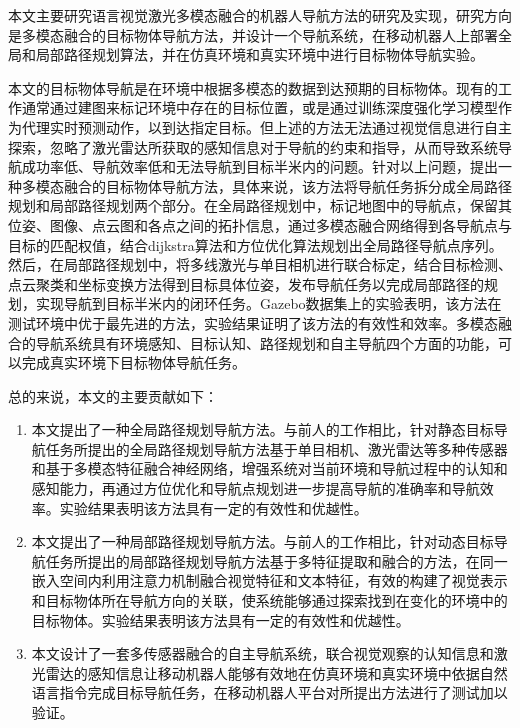 	本文主要研究语言视觉激光多模态融合的机器人导航方法的研究及实现，研究方向是多模态融合的目标物体导航方法，并设计一个导航系统，在移动机器人上部署全局和局部路径规划算法，并在仿真环境和真实环境中进行目标物体导航实验。
	
	本文的目标物体导航是在环境中根据多模态的数据到达预期的目标物体。现有的工作通常通过建图来标记环境中存在的目标位置，或是通过训练深度强化学习模型作为代理实时预测动作，以到达指定目标。但上述的方法无法通过视觉信息进行自主探索，忽略了激光雷达所获取的感知信息对于导航的约束和指导，从而导致系统导航成功率低、导航效率低和无法导航到目标半米内的问题。针对以上问题，提出一种多模态融合的目标物体导航方法，具体来说，该方法将导航任务拆分成全局路径规划和局部路径规划两个部分。在全局路径规划中，标记地图中的导航点，保留其位姿、图像、点云图和各点之间的拓扑信息，通过多模态融合网络得到各导航点与目标的匹配权值，结合dijkstra算法和方位优化算法规划出全局路径导航点序列。然后，在局部路径规划中，将多线激光与单目相机进行联合标定，结合目标检测、点云聚类和坐标变换方法得到目标具体位姿，发布导航任务以完成局部路径的规划，实现导航到目标半米内的闭环任务。Gazebo数据集上的实验表明，该方法在测试环境中优于最先进的方法，实验结果证明了该方法的有效性和效率。多模态融合的导航系统具有环境感知、目标认知、路径规划和自主导航四个方面的功能，可以完成真实环境下目标物体导航任务。

	总的来说，本文的主要贡献如下：
	\begin{enumerate}[topsep = 0 pt, itemsep= 0 pt, parsep=0pt, partopsep=0pt, leftmargin=44pt, itemindent=0pt, labelsep=6pt, label=(\arabic*)]
		\item 	本文提出了一种全局路径规划导航方法。与前人的工作相比，针对静态目标导航任务所提出的全局路径规划导航方法基于单目相机、激光雷达等多种传感器和基于多模态特征融合神经网络，增强系统对当前环境和导航过程中的认知和感知能力，再通过方位优化和导航点规划进一步提高导航的准确率和导航效率。实验结果表明该方法具有一定的有效性和优越性。
		\item	本文提出了一种局部路径规划导航方法。与前人的工作相比，针对动态目标导航任务所提出的局部路径规划导航方法基于多特征提取和融合的方法，在同一嵌入空间内利用注意力机制融合视觉特征和文本特征，有效的构建了视觉表示和目标物体所在导航方向的关联，使系统能够通过探索找到在变化的环境中的目标物体。实验结果表明该方法具有一定的有效性和优越性。
		\item	本文设计了一套多传感器融合的自主导航系统，联合视觉观察的认知信息和激光雷达的感知信息让移动机器人能够有效地在仿真环境和真实环境中依据自然语言指令完成目标导航任务，在移动机器人平台对所提出方法进行了测试加以验证。
	\end{enumerate}


